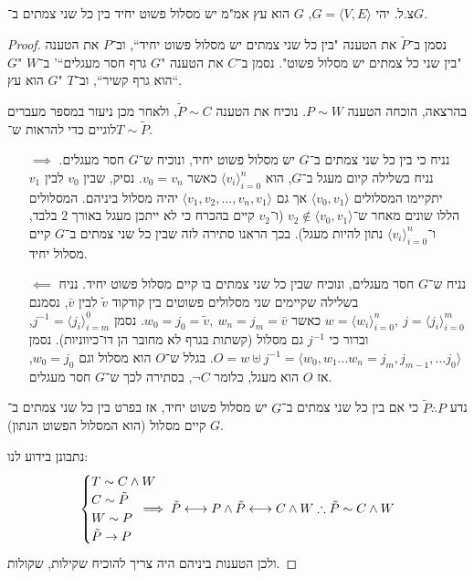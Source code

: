 \documentclass[]{article}
\newcommand\unquad {\!\!\!\!}
\newcommand\siff  {\longleftrightarrow}
\newcommand\ra    {\rangle}
\newcommand\la    {\langle}
\newcommand\tl    {\tilde}
\newcommand\op    {^{-1}}
\begin{document}
	\section{}
	צ.ל. יהי $G = \la V, E \ra$, $G$ הוא עץ אמ"מ יש מסלול פשוט יחיד בין כל שני צמתים ב־$G$. 
	\begin{proof}
		נסמן ב־$\tl P$ את הטענה "בין כל שני צמתים יש מסלול פשוט יחיד``, וב־$P$ את הטענה "בין שני כל צמתים יש מסלול פשוט". נסמן ב־$C$ את הטענה "$G$ גרף חסר מעגלים``' ב־$W$ "$G$ הוא גרף קשיר``, וב־$T$ "$G$ הוא עץ``. 
		
		בהרצאה, הוכחה הטענה $P \sim W$. נוכיח את הטענה $\tl P \sim C$, ולאחר מכן ניעזר במספר מעברים לוגיים כדי להראות ש־$T \sim \tl P$. 
		
		\begin{itemize}
			\item[$\implies$] נניח כי בין כל שני צמתים ב־$G$ יש מסלול פשוט יחיד, ונוכיח ש־$G$ חסר מעגלים. נניח בשלילה קיום מעגל ב־$G$, הוא $\la v_i \ra_{i = 0}^{n}$ כאשר $v_0 = v_n$. נסיק, שבין $v_0$ לבין $v_1$ יתקיימו המסלולים $\la v_0, v_1 \ra$ אך גם $\la v_1, v_2, \dots, v_n, v_1 \ra$ יהיה מסלול ביניהם. המסלולים הללו שונים מאחר ש־$v_2 \notin \la v_0, v_1 \ra$ (ו־$v_2$ קיים בהכרח כי לא ייתכן מעגל באורך $2$ בלבד, ו־$\la v_i \ra_{i = 0}^n$ נתון להיות מעגל). בכך הראנו סתירה לזה שבין כל שני צמתים ב־$G$ קיים מסלול יחיד. 
			\item[$\impliedby$] נניח ש־$G$ חסר מעגלים, ונוכיח שבין כל שני צמתים בו קיים מסלול פשוט יחיד. נניח בשלילה שקיימים שני מסלולים פשוטים בין קודקוד $\tl v$ לבין $\bar v$, נסמנם $w = \la w_i \ra_{i = 0}^n, \ j = \la j_i \ra_{i = 0}^m$ כאשר $w_0 = j_0 = \tl v, \ w_n = j_m = \bar v$. נסמן $j\op = \la j_i \ra_{i = m}^0$, וברור כי $j\op$ גם מסלול (קשתות בגרף לא מחובר הן דו־כיווניות). נסמן $O = w \uplus j\op = \la w_0, w_1 \dots w_n = j_m, j_{m - 1}, \dots j_0 \ra$. בגלל ש־$O$ הוא מסלול וגם $w_0 = j_0$, אז $O$ הוא מעגל, כלומר $\lnot C$, בסתירה לכך ש־$G$ חסר מעגלים. 
		\end{itemize}
		נדע $\tl P \therefore P$ כי אם בין כל שני צמתים ב־$G$ יש מסלול פשוט יחיד, אז בפרט בין כל שני צמתים ב־$G$ קיים מסלול (הוא המסלול הפשוט הנתון). 
		
		נתבונן בידוע לנו: 
		\[ \begin{cases}
			T \sim C \land W \\
			C \sim \tl P \\
			W \sim P \\
			\tl P \to P
		\end{cases} \unquad \unquad \unquad \unquad \implies
		\tl P \siff P \land \tl P \siff C \land W \therefore \tl P \sim C \land W \\
		\]
		ולכן הטענות ביניהם היה צריך להוכיח שקילות, שקולות. 
	\end{proof}
	\section{}
	\section{}
	\section{}
	\section{}
	
\end{document}

